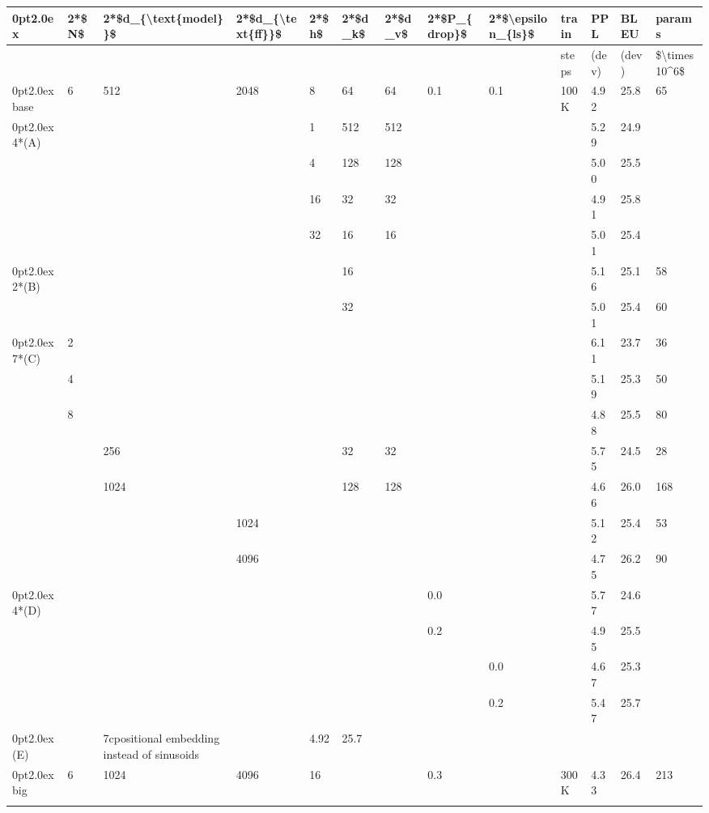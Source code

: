 \documentclass[11pt,a4paper]{article}
\begin{document}
\begin{table}[h]
\begin{tabular}{|l|l|l|l|l|l|l|l|l|l|l|l|l|}
\hline
0pt2.0ex & 2*\$N\$ & 2*\$d\_\{\textbackslash{}text\{model\}\}\$ & 2*\$d\_\{\textbackslash{}text\{ff\}\}\$ & 2*\$h\$ & 2*\$d\_k\$ & 2*\$d\_v\$ & 2*\$P\_\{drop\}\$ & 2*\$\textbackslash{}epsilon\_\{ls\}\$ & train & PPL & BLEU & params \\ \hline
 &  &  &  &  &  &  &  &  & steps & (dev) & (dev) & \$\textbackslash{}times10\textasciicircum{}6\$ \\ \hline
0pt2.0ex base & 6 & 512 & 2048 & 8 & 64 & 64 & 0.1 & 0.1 & 100K & 4.92 & 25.8 & 65 \\ \hline
0pt2.0ex 4*(A) &  &  &  & 1 & 512 & 512 &  &  &  & 5.29 & 24.9 &  \\ \hline
 &  &  &  & 4 & 128 & 128 &  &  &  & 5.00 & 25.5 &  \\ \hline
 &  &  &  & 16 & 32 & 32 &  &  &  & 4.91 & 25.8 &  \\ \hline
 &  &  &  & 32 & 16 & 16 &  &  &  & 5.01 & 25.4 &  \\ \hline
0pt2.0ex 2*(B) &  &  &  &  & 16 &  &  &  &  & 5.16 & 25.1 & 58 \\ \hline
 &  &  &  &  & 32 &  &  &  &  & 5.01 & 25.4 & 60 \\ \hline
0pt2.0ex 7*(C) & 2 &  &  &  &  &  &  &  &  & 6.11 & 23.7 & 36 \\ \hline
 & 4 &  &  &  &  &  &  &  &  & 5.19 & 25.3 & 50 \\ \hline
 & 8 &  &  &  &  &  &  &  &  & 4.88 & 25.5 & 80 \\ \hline
 &  & 256 &  &  & 32 & 32 &  &  &  & 5.75 & 24.5 & 28 \\ \hline
 &  & 1024 &  &  & 128 & 128 &  &  &  & 4.66 & 26.0 & 168 \\ \hline
 &  &  & 1024 &  &  &  &  &  &  & 5.12 & 25.4 & 53 \\ \hline
 &  &  & 4096 &  &  &  &  &  &  & 4.75 & 26.2 & 90 \\ \hline
0pt2.0ex 4*(D) &  &  &  &  &  &  & 0.0 &  &  & 5.77 & 24.6 &  \\ \hline
 &  &  &  &  &  &  & 0.2 &  &  & 4.95 & 25.5 &  \\ \hline
 &  &  &  &  &  &  &  & 0.0 &  & 4.67 & 25.3 &  \\ \hline
 &  &  &  &  &  &  &  & 0.2 &  & 5.47 & 25.7 &  \\ \hline
0pt2.0ex (E) &  & 7cpositional embedding instead of sinusoids &  & 4.92 & 25.7 &  &  &  &  &  &  &  \\ \hline
0pt2.0ex big & 6 & 1024 & 4096 & 16 &  &  & 0.3 &  & 300K & 4.33 & 26.4 & 213 \\ \hline
 &  &  &  &  &  &  &  &  &  &  &  &  \\ \hline
\end{tabular}
\end{table}
\end{document}
